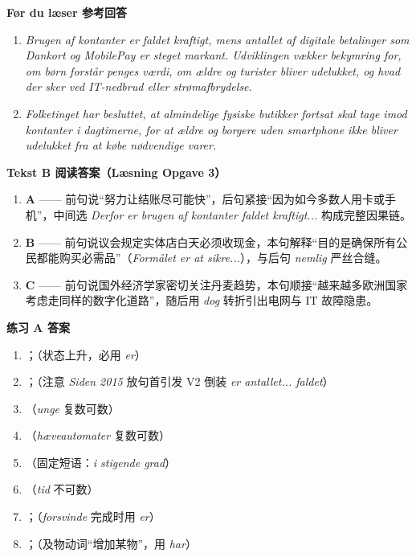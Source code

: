 \begin{answerbox}
\textbf{Før du læser 参考回答}
\begin{enumerate}
  \item \textit{Brugen af kontanter er faldet kraftigt, mens antallet af digitale betalinger som Dankort og MobilePay er steget markant. Udviklingen vækker bekymring for, om børn forstår penges værdi, om ældre og turister bliver udelukket, og hvad der sker ved IT-nedbrud eller strømafbrydelse.}
  \item \textit{Folketinget har besluttet, at almindelige fysiske butikker fortsat skal tage imod kontanter i dagtimerne, for at ældre og borgere uden smartphone ikke bliver udelukket fra at købe nødvendige varer.}
\end{enumerate}

\textbf{Tekst B 阅读答案（Læsning Opgave 3）}
\begin{enumerate}
  \item \textbf{A} —— 前句说“努力让结账尽可能快”，后句紧接“因为如今多数人用卡或手机”，中间选 \textit{Derfor er brugen af kontanter faldet kraftigt...} 构成完整因果链。
  \item \textbf{B} —— 前句说议会规定实体店白天必须收现金，本句解释“目的是确保所有公民都能购买必需品”（\textit{Formålet er at sikre...}），与后句 \textit{nemlig} 严丝合缝。
  \item \textbf{C} —— 前句说国外经济学家密切关注丹麦趋势，本句顺接“越来越多欧洲国家考虑走同样的数字化道路”，随后用 \textit{dog} 转折引出电网与 IT 故障隐患。
\end{enumerate}

\textbf{练习 A 答案}
\begin{enumerate}
  \item {}；（状态上升，必用 \textit{er}）
  \item {}；（注意 \textit{Siden 2015} 放句首引发 V2 倒装 \textit{er antallet... faldet}）
  \item {}（\textit{unge} 复数可数）
  \item {}（\textit{hæveautomater} 复数可数）
  \item {}（固定短语：\textit{i stigende grad}）
  \item {}（\textit{tid} 不可数）
  \item {}；（\textit{forsvinde} 完成时用 \textit{er}）
  \item {}；（及物动词“增加某物”，用 \textit{har}）
\end{enumerate}


\end{answerbox}

